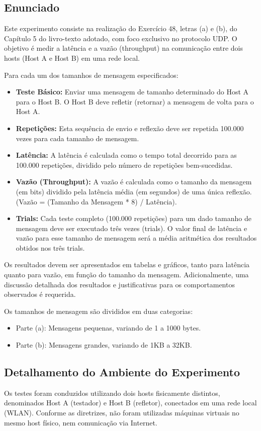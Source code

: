 \subsection{Enunciado}
\label{subsec:enunciado_exp2}
Este experimento consiste na realização do Exercício 48, letras (a) e (b), do Capítulo 5 do livro-texto adotado, com foco exclusivo no protocolo UDP. O objetivo é medir a latência e a vazão (throughput) na comunicação entre dois hosts (Host A e Host B) em uma rede local.

Para cada um dos tamanhos de mensagem especificados:
\begin{itemize}
    \item \textbf{Teste Básico:} Enviar uma mensagem de tamanho determinado do Host A para o Host B. O Host B deve refletir (retornar) a mensagem de volta para o Host A.
    \item \textbf{Repetições:} Esta sequência de envio e reflexão deve ser repetida 100.000 vezes para cada tamanho de mensagem.
    \item \textbf{Latência:} A latência é calculada como o tempo total decorrido para as 100.000 repetições, dividido pelo número de repetições bem-sucedidas.
    \item \textbf{Vazão (Throughput):} A vazão é calculada como o tamanho da mensagem (em bits) dividido pela latência média (em segundos) de uma única reflexão. (Vazão = (Tamanho da Mensagem * 8) / Latência).
    \item \textbf{Trials:} Cada teste completo (100.000 repetições) para um dado tamanho de mensagem deve ser executado três vezes (trials). O valor final de latência e vazão para esse tamanho de mensagem será a média aritmética dos resultados obtidos nos três trials.
\end{itemize}
Os resultados devem ser apresentados em tabelas e gráficos, tanto para latência quanto para vazão, em função do tamanho da mensagem. Adicionalmente, uma discussão detalhada dos resultados e justificativas para os comportamentos observados é requerida.

Os tamanhos de mensagem são divididos em duas categorias:
\begin{itemize}
    \item Parte (a): Mensagens pequenas, variando de 1 a 1000 bytes.
    \item Parte (b): Mensagens grandes, variando de 1KB a 32KB.
\end{itemize}

\subsection{Detalhamento do Ambiente do Experimento}
\label{subsec:ambiente_exp2}
Os testes foram conduzidos utilizando dois hosts fisicamente distintos, denominados Host A (testador) e Host B (refletor), conectados em uma rede local (WLAN). Conforme as diretrizes, não foram utilizadas máquinas virtuais no mesmo host físico, nem comunicação via Internet.

